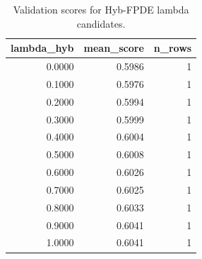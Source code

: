 \begin{table}[t]
\caption{Validation scores for Hyb-FPDE lambda candidates.}
\label{tab:lambda_distribution_computed}
\centering
\begin{tabular}{rrr}
\toprule
lambda\_hyb & mean\_score & n\_rows \\
\midrule
0.0000 & 0.5986 & 1 \\
0.1000 & 0.5976 & 1 \\
0.2000 & 0.5994 & 1 \\
0.3000 & 0.5999 & 1 \\
0.4000 & 0.6004 & 1 \\
0.5000 & 0.6008 & 1 \\
0.6000 & 0.6026 & 1 \\
0.7000 & 0.6025 & 1 \\
0.8000 & 0.6033 & 1 \\
0.9000 & 0.6041 & 1 \\
1.0000 & 0.6041 & 1 \\
\bottomrule
\end{tabular}

\end{table}
